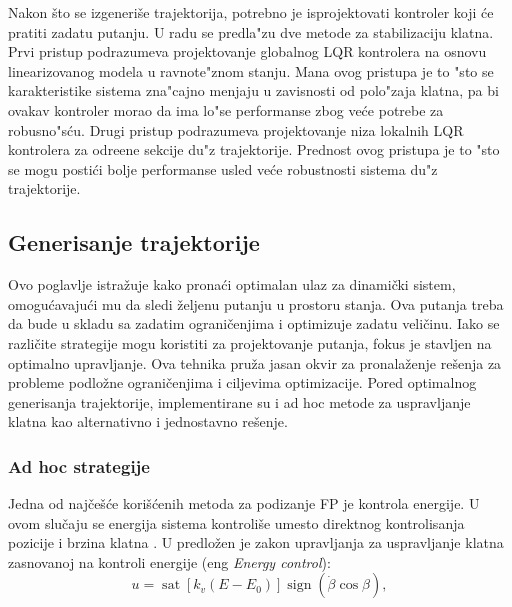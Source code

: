 \documentclass[a4paper,11pt]{article}
\theoremstyle{definition} \newtheorem{deff}{Definicija}[section]
\theoremstyle{definition} \newtheorem{prim}[deff]{Primer}
\theoremstyle{plain} \newtheorem{teor}[deff]{Teorema}
\begin{document}
	Nakon što se izgeneriše trajektorija, potrebno je isprojektovati kontroler koji će pratiti zadatu putanju. U radu \cite{inicijalna} se predla"zu dve metode za stabilizaciju klatna. Prvi pristup podrazumeva projektovanje globalnog LQR kontrolera na osnovu linearizovanog modela u ravnote"znom stanju. Mana ovog pristupa je to "sto se karakteristike sistema zna"cajno menjaju u zavisnosti od polo"zaja klatna, pa bi ovakav kontroler morao da ima lo"se performanse zbog ve\'ce potrebe za robusno"s\'cu. Drugi pristup podrazumeva projektovanje niza lokalnih LQR kontrolera za odre\dj ene sekcije du"z trajektorije. Prednost ovog pristupa je to "sto se mogu posti\'ci bolje performanse usled ve\'ce robustnosti sistema du"z trajektorije.  \\[16pt]
	

	\subsection{Generisanje trajektorije}\label{sec:gen_traj}
	
	Ovo poglavlje istražuje kako pronaći optimalan ulaz za dinamički sistem, omogućavajući mu da sledi željenu putanju u prostoru stanja. Ova putanja treba da bude u skladu sa zadatim ograničenjima i optimizuje zadatu veličinu. Iako se različite strategije mogu koristiti za projektovanje putanja, fokus je stavljen na optimalno upravljanje. Ova tehnika pruža jasan okvir za pronalaženje rešenja za probleme podložne ograničenjima i ciljevima optimizacije. Pored optimalnog generisanja trajektorije, implementirane su i ad hoc metode za uspravljanje klatna kao alternativno i jednostavno rešenje. 
	
	\subsubsection{Ad hoc strategije}
	\label{sec:andhoc}
	
	Jedna od najčešće korišćenih metoda za podizanje FP je kontrola energije. U ovom slučaju se energija sistema kontroliše umesto direktnog kontrolisanja pozicije i brzina klatna \cite{inicijalna}.
	U \cite{energy_c} predložen je zakon upravljanja za uspravljanje klatna zasnovanoj na kontroli energije (eng \textit{Energy control}): \\
	
	\begin{equation}
		u = \operatorname{sat}\left[k_v (E - E_0)\right] \operatorname{sign}( \dot{\beta} \cos \beta), 
		\label{eq:en_control}
	\end{equation} \\
	
\end{document}
